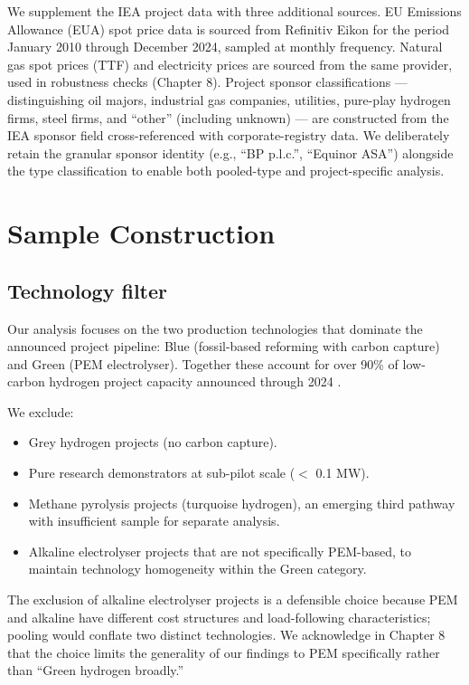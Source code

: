 We supplement the IEA project data with three additional sources. EU Emissions Allowance (EUA) spot price data is sourced from Refinitiv Eikon for the period January 2010 through December 2024, sampled at monthly frequency. Natural gas spot prices (TTF) and electricity prices are sourced from the same provider, used in robustness checks (Chapter 8). Project sponsor classifications --- distinguishing oil majors, industrial gas companies, utilities, pure-play hydrogen firms, steel firms, and ``other'' (including unknown) --- are constructed from the IEA sponsor field cross-referenced with corporate-registry data. We deliberately retain the granular sponsor identity (e.g., ``BP p.l.c.'', ``Equinor ASA'') alongside the type classification to enable both pooled-type and project-specific analysis.

\section{Sample Construction}
\label{sec:ch4-construction}

\subsection{Technology filter}

Our analysis focuses on the two production technologies that dominate the announced project pipeline: Blue (fossil-based reforming with carbon capture) and Green (PEM electrolyser). Together these account for over 90\% of low-carbon hydrogen project capacity announced through 2024 \cite{iea2024hydrogenprojects}.

We exclude:
\begin{itemize}
    \item Grey hydrogen projects (no carbon capture).
    \item Pure research demonstrators at sub-pilot scale ($<$ 0.1 MW).
    \item Methane pyrolysis projects (turquoise hydrogen), an emerging third pathway with insufficient sample for separate analysis.
    \item Alkaline electrolyser projects that are not specifically PEM-based, to maintain technology homogeneity within the Green category.
\end{itemize}
The exclusion of alkaline electrolyser projects is a defensible choice because PEM and alkaline have different cost structures and load-following characteristics; pooling would conflate two distinct technologies. We acknowledge in Chapter 8 that the choice limits the generality of our findings to PEM specifically rather than ``Green hydrogen broadly.''

